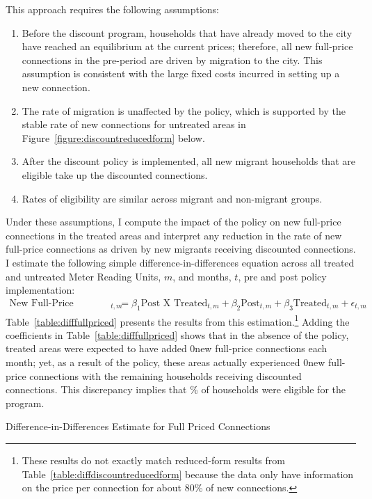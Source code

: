 \documentclass[12pt]{article}
\begin{document}
\begin{appendices}
This approach requires the following assumptions:
\begin{enumerate}
	\item Before the discount program, households that have already moved to the city have reached an equilibrium at the current prices; therefore, all new full-price connections in the pre-period are driven by migration to the city.  This assumption is consistent with the large fixed costs incurred in setting up a new connection.
	\item The rate of migration is unaffected by the policy, which is supported by the stable rate of new connections for untreated areas in Figure~\ref{figure:discountreducedform} below.  
	\item After the discount policy is implemented, all new migrant households that are eligible take up the discounted connections.
	\item Rates of eligibility are similar across migrant and non-migrant groups.
\end{enumerate}
Under these assumptions, I compute the impact of the policy on new full-price connections in the treated areas and interpret any reduction in the rate of new full-price connections as driven by new migrants receiving discounted connections.  I estimate the following simple difference-in-differences equation across all treated and untreated Meter Reading Units, $m$, and months, $t$, pre and post policy implementation:
\begin{align*}
\text{New Full-Price Connections}_{t,m} &= \beta_1 \text{Post X Treated}_{t,m} + \beta_2 \text{Post}_{t,m} + \beta_3 \text{Treated}_{t,m} + \epsilon_{t,m}
\end{align*}
Table~\ref{table:difffullpriced} presents the results from this estimation.\footnote{These results do not exactly match reduced-form results from Table~\ref{table:diffdiscountreducedform} because the data only have information on the price per connection for about 80\% of new connections.}  Adding the coefficients in Table~\ref{table:difffullpriced} shows that in the absence of the policy, treated areas were expected to have added 0new full-price connections each month; yet, as a result of the policy, these areas actually experienced 0new full-price connections with the remaining households receiving discounted connections.  This discrepancy implies that \unskip\% of households were eligible for the program.

\begin{table}
\centering
\caption{Difference-in-Differences Estimate for Full Priced Connections}\label{table:difffullpriced}

\end{table}


\end{appendices}
\end{document}
